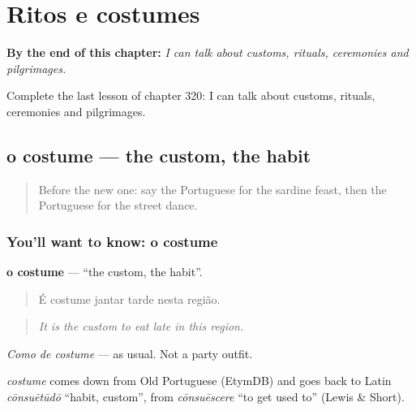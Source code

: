 
\chapter{Ritos e costumes}
\label{ch:pt-ritos-e-costumes}

\begin{chapteropening}
\textbf{By the end of this chapter:} \emph{I can talk about customs, rituals, ceremonies and pilgrimages.}

Complete the last lesson of chapter 320: I can talk about customs, rituals, ceremonies and pilgrimages.
\end{chapteropening}

\section[o costume]{o costume — the custom, the habit}

\label{lesson:PT-C320-costume}



\begin{quote}
Before the new one: say the Portuguese for the sardine feast, then the Portuguese for the street dance.
\end{quote}

\subsection*{You'll want to know: o costume}
\textbf{o costume} — \textquotedblleft{}the custom, the habit\textquotedblright{}.

\begin{quote}
É costume jantar tarde nesta região.
\end{quote}

\begin{quote}
\emph{It is the custom to eat late in this region.}
\end{quote}

\emph{Como de costume} — as usual. Not a party outfit.

\begin{cousinweb}
\emph{costume} comes down from Old Portuguese (EtymDB) and goes back to Latin \emph{cōnsuētūdō} \textquotedblleft{}habit, custom\textquotedblright{}, from \emph{cōnsuēscere} \textquotedblleft{}to get used to\textquotedblright{} (Lewis \& Short).
\end{cousinweb}


